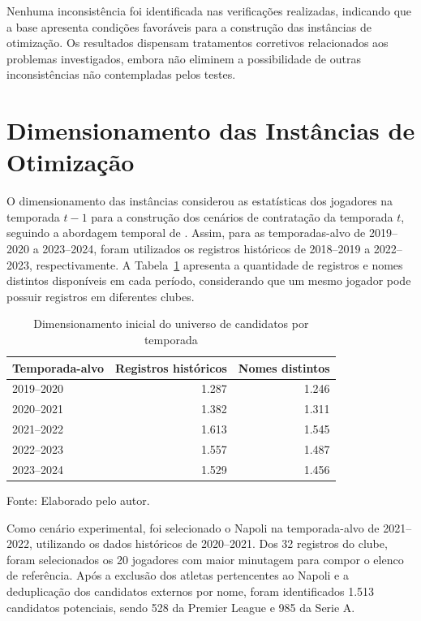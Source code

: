 \documentclass[12pt,a4paper]{article}
\begin{document}
Nenhuma inconsistência foi identificada nas verificações realizadas, indicando que a base apresenta condições favoráveis para a construção das instâncias de otimização. Os resultados dispensam tratamentos corretivos relacionados aos problemas investigados, embora não eliminem a possibilidade de outras inconsistências não contempladas pelos testes.

\section{Dimensionamento das Instâncias de Otimização}

O dimensionamento das instâncias considerou as estatísticas dos jogadores na temporada $t-1$ para a construção dos cenários de contratação da temporada $t$, seguindo a abordagem temporal de \textcite{nunes2026}. Assim, para as temporadas-alvo de 2019--2020 a 2023--2024, foram utilizados os registros históricos de 2018--2019 a 2022--2023, respectivamente. A Tabela~\ref{tab:universo_candidatos} apresenta a quantidade de registros e nomes distintos disponíveis em cada período, considerando que um mesmo jogador pode possuir registros em diferentes clubes.

\begin{table}[htbp]
    \centering
    \caption{Dimensionamento inicial do universo de candidatos por temporada}
    \label{tab:universo_candidatos}
    \begin{tabular}{lrr}
        \hline
        \textbf{Temporada-alvo} & \textbf{Registros históricos} & \textbf{Nomes distintos} \\
        \hline
        2019--2020 & 1.287 & 1.246 \\
        2020--2021 & 1.382 & 1.311 \\
        2021--2022 & 1.613 & 1.545 \\
        2022--2023 & 1.557 & 1.487 \\
        2023--2024 & 1.529 & 1.456 \\
        \hline
    \end{tabular}
    \par\smallskip
    \footnotesize Fonte: Elaborado pelo autor.
\end{table}

Como cenário experimental, foi selecionado o Napoli na temporada-alvo de 2021--2022, utilizando os dados históricos de 2020--2021. Dos 32 registros do clube, foram selecionados os 20 jogadores com maior minutagem para compor o elenco de referência. Após a exclusão dos atletas pertencentes ao Napoli e a deduplicação dos candidatos externos por nome, foram identificados 1.513 candidatos potenciais, sendo 528 da Premier League e 985 da Serie A.
\end{document}
